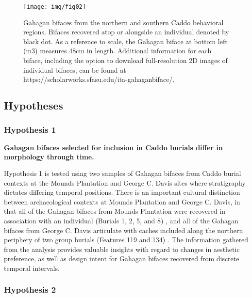 \documentclass[]{interact}
\theoremstyle{plain}%
\theoremstyle{definition}
\theoremstyle{remark}
\begin{document}
\begin{figure}

{\centering \texttt{[image: img/fig02]} 

}

\caption{Gahagan bifaces from the northern and southern Caddo behavioral regions. Bifaces recovered atop or alongside an individual denoted by black dot. As a reference to scale, the Gahagan biface at bottom left (m3) measures 48cm in length. Additional information for each biface, including the option to download full-resolution 2D images of individual bifaces, can be found at https://scholarworks.sfasu.edu/ita-gahaganbiface/.}\label{fig:gahagan bifaces 2D}
\end{figure}

\hypertarget{hypotheses}{%
\subsection{Hypotheses}\label{hypotheses}}

\hypertarget{hypothesis-1}{%
\subsubsection{Hypothesis 1}\label{hypothesis-1}}

\textbf{Gahagan bifaces selected for inclusion in Caddo burials differ
in morphology through time.}

Hypothesis 1 is tested using two samples of Gahagan bifaces from Caddo
burial contexts at the Mounds Plantation and George C. Davis sites where
stratigraphy dictates differing temporal positions. There is an
important cultural distinction between archaeological contexts at Mounds
Plantation and George C. Davis, in that all of the Gahagan bifaces from
Mounds Plantation were recovered in association with an individual
(Burials 1, 2, 5, and 8) \citep{RN8174}, and all of the Gahagan bifaces
from George C. Davis articulate with caches included along the northern
periphery of two group burials (Features 119 and 134)
\citep{RN5746,RN8186}. The information gathered from the analysis
provides valuable insights with regard to changes in aesthetic
preference, as well as design intent for Gahagan bifaces recovered from
discrete temporal intervals.

\hypertarget{hypothesis-2}{%
\subsubsection{Hypothesis 2}\label{hypothesis-2}}
\end{document}
